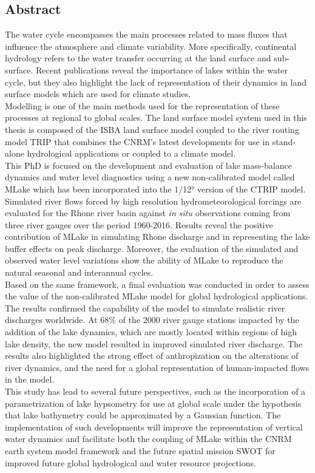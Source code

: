 \documentclass[a4paper,12pt,twoside]{StyleThese}
\begin{document}
\begin{vcenterpage}
\chapter*{{\selectfont Abstract}}
\label{chap:abstract}
\noindent The water cycle encompasses the main processes related to mass fluxes that influence the atmosphere and climate variability. More specifically, continental hydrology refers to the water transfer occurring at the land surface and sub-surface. Recent publications reveal the importance of lakes within the water cycle, but they also highlight the lack of representation of their dynamics in land surface models which are used for climate studies.
\\
Modelling is one of the main methods used for the representation of these processes at regional to global scales. The land surface model system used in this thesis is composed of the ISBA land surface model coupled to the river routing model TRIP that combines the CNRM’s latest developments for use in stand-alone hydrological applications or coupled to a climate model.
\\
This PhD is focused on the development and evaluation of lake mass-balance dynamics and water level diagnostics using a new non-calibrated model called MLake which has been incorporated into the 1/12° version of the CTRIP model. 
\\
Simulated river flows forced by high resolution hydrometeorological forcings are evaluated for the Rhone river basin against \textit{in situ} observations coming from three river gauges over the period 1960-2016. Results reveal the positive contribution of MLake in simulating Rhone discharge and in representing the lake buffer effects on peak discharge. Moreover, the evaluation of the simulated and observed water level variations show the ability of MLake to reproduce the natural seasonal and interannual cycles. 
\\
Based on the same framework, a final evaluation was conducted in order to assess the value of the non-calibrated MLake model for global hydrological applications. The results confirmed the capability of the model to simulate realistic river discharges worldwide. At 68\% of the 2000 river gauge stations impacted by the addition of the lake dynamics, which are mostly located within regions of high lake density, the new model resulted in improved simulated river discharge. The results also highlighted the strong effect of anthropization on the alterations of river dynamics, and the need for a global representation of human-impacted flows in the model. 
\\
This study has lead to several future perspectives, such as the incorporation of a parametrization of lake hypsometry for use at global scale under the hypothesis that lake bathymetry could be approximated by a Gaussian function. The implementation of such developments will improve the representation of vertical water dynamics and facilitate both the coupling of MLake within the CNRM earth system model framework and the future spatial mission SWOT for improved future global hydrological and water resource projections.

\end{vcenterpage}
\end{document}
